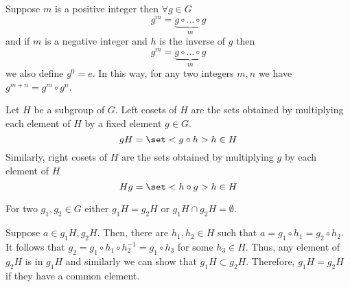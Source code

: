 Suppose \(m\) is a positive integer then \(\forall g \in G\) 
\begin{equation*}
    g^m =  \underbrace{g \circ \dots \circ g}_m
\end{equation*}
and if \(m\) is a negative integer and \(h\) is the inverse of \(g\) then 
\begin{equation*}
    g^{m} = \underbrace{g \circ \dots \circ g}_m
\end{equation*}
we also define \(g^0 = e\). In this way, for any two integers \(m,n\) we have \(g^{m + n} = g^m \circ g^n\). 

Let \(H\) be a subgroup of \(G\). Left cosets of \(H\) are the sets obtained by multiplying each element of \(H\) by a fixed element \(g \in G\). 
\begin{equation*}
    gH = \set<g \circ h>{h \in H}
\end{equation*}
Similarly, right cosets of \(H\) are the sets obtained by multiplying \(g\) by each element of \(H\) 
\begin{equation*}
    Hg = \set<h \circ g>{h \in H}
\end{equation*}

\begin{proposition}
    For two \(g_1,g_2 \in G\) either \(g_1H = g_2H\) or \(g_1H \cap g_2H = \emptyset\).
\end{proposition}
\begin{proposition}
    Suppose \(a \in g_1H, g_2H\). Then, there are \(h_1,h_2 \in H\) such that \(a = g_1 \circ h_1 = g_2 \circ h_2\). It follows that \(g_2 = g_1 \circ h_1 \circ h_2^{-1} = g_1 \circ h_3\) for some \(h_3 \in H\). Thus, any element of \(g_2H\) is in \(g_1H\) and similarly we can show that \(g_1H \subset g_2H\). Therefore, \(g_1H = g_2H\) if they have a common element. 
\end{proposition}

